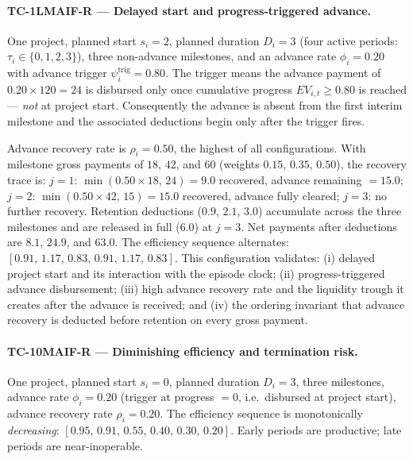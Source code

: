 \paragraph{TC-1LMAIF-R --- Delayed start and progress-triggered advance.}
One project, planned start $s_i = 2$, planned duration $D_i = 3$
(four active periods: $\tau_i \in \{0,1,2,3\}$), three non-advance
milestones, and an advance rate $\phi_i = 0.20$ with advance trigger
$\psi^{\mathrm{trig}}_i = 0.80$.  The trigger means the advance
payment of $0.20 \times 120 = 24$ is disbursed only once cumulative
progress $EV_{i,t} \geq 0.80$ is reached --- \emph{not} at project
start.  Consequently the advance is absent from the first interim
milestone and the associated deductions begin only after the trigger
fires.

Advance recovery rate is $\rho_i = 0.50$, the highest of all
configurations.  With milestone gross payments of $18$, $42$, and $60$
(weights $0.15$, $0.35$, $0.50$), the recovery trace is:
$j=1$: $\min(0.50 \times 18,\, 24) = 9.0$ recovered, advance
remaining $= 15.0$;
$j=2$: $\min(0.50 \times 42,\, 15) = 15.0$ recovered, advance
fully cleared;
$j=3$: no further recovery.
Retention deductions ($0.9$, $2.1$, $3.0$) accumulate across the three
milestones and are released in full ($6.0$) at $j=3$.
Net payments after deductions are $8.1$, $24.9$, and $63.0$.
The efficiency sequence alternates: $[0.91,\, 1.17,\, 0.83,\, 0.91,\, 1.17,\, 0.83]$.
This configuration validates: (i) delayed project start and its
interaction with the episode clock; (ii) progress-triggered advance
disbursement; (iii) high advance recovery rate and the liquidity trough
it creates after the advance is received; and (iv) the ordering
invariant that advance recovery is deducted before retention on every
gross payment.

\paragraph{TC-10MAIF-R --- Diminishing efficiency and termination risk.}
One project, planned start $s_i = 0$, planned duration $D_i = 3$,
three milestones, advance rate $\phi_i = 0.20$ (trigger at progress
$= 0$, i.e.\ disbursed at project start), advance recovery rate
$\rho_i = 0.20$.  The efficiency sequence is monotonically
\emph{decreasing}: $[0.95,\, 0.91,\, 0.55,\, 0.40,\, 0.30,\, 0.20]$.
Early periods are productive; late periods are near-inoperable.

